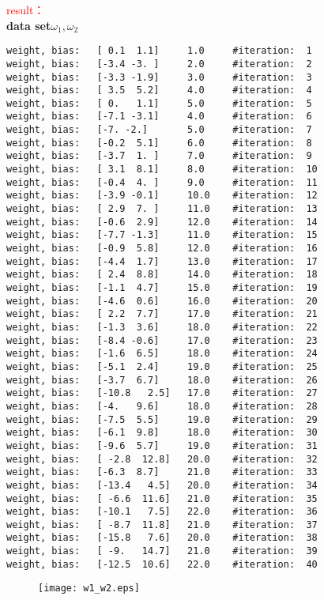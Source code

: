 \noindent \textcolor{red}{result：}\\\textbf{data set$\omega_1,\omega_2$}
\begin{lstlisting}
weight, bias:   [ 0.1  1.1]     1.0     #iteration:  1
weight, bias:   [-3.4 -3. ]     2.0     #iteration:  2
weight, bias:   [-3.3 -1.9]     3.0     #iteration:  3
weight, bias:   [ 3.5  5.2]     4.0     #iteration:  4
weight, bias:   [ 0.   1.1]     5.0     #iteration:  5
weight, bias:   [-7.1 -3.1]     4.0     #iteration:  6
weight, bias:   [-7. -2.]       5.0     #iteration:  7
weight, bias:   [-0.2  5.1]     6.0     #iteration:  8
weight, bias:   [-3.7  1. ]     7.0     #iteration:  9
weight, bias:   [ 3.1  8.1]     8.0     #iteration:  10
weight, bias:   [-0.4  4. ]     9.0     #iteration:  11
weight, bias:   [-3.9 -0.1]     10.0    #iteration:  12
weight, bias:   [ 2.9  7. ]     11.0    #iteration:  13
weight, bias:   [-0.6  2.9]     12.0    #iteration:  14
weight, bias:   [-7.7 -1.3]     11.0    #iteration:  15
weight, bias:   [-0.9  5.8]     12.0    #iteration:  16
weight, bias:   [-4.4  1.7]     13.0    #iteration:  17
weight, bias:   [ 2.4  8.8]     14.0    #iteration:  18
weight, bias:   [-1.1  4.7]     15.0    #iteration:  19
weight, bias:   [-4.6  0.6]     16.0    #iteration:  20
weight, bias:   [ 2.2  7.7]     17.0    #iteration:  21
weight, bias:   [-1.3  3.6]     18.0    #iteration:  22
weight, bias:   [-8.4 -0.6]     17.0    #iteration:  23
weight, bias:   [-1.6  6.5]     18.0    #iteration:  24
weight, bias:   [-5.1  2.4]     19.0    #iteration:  25
weight, bias:   [-3.7  6.7]     18.0    #iteration:  26
weight, bias:   [-10.8   2.5]   17.0    #iteration:  27
weight, bias:   [-4.   9.6]     18.0    #iteration:  28
weight, bias:   [-7.5  5.5]     19.0    #iteration:  29
weight, bias:   [-6.1  9.8]     18.0    #iteration:  30
weight, bias:   [-9.6  5.7]     19.0    #iteration:  31
weight, bias:   [ -2.8  12.8]   20.0    #iteration:  32
weight, bias:   [-6.3  8.7]     21.0    #iteration:  33
weight, bias:   [-13.4   4.5]   20.0    #iteration:  34
weight, bias:   [ -6.6  11.6]   21.0    #iteration:  35
weight, bias:   [-10.1   7.5]   22.0    #iteration:  36
weight, bias:   [ -8.7  11.8]   21.0    #iteration:  37
weight, bias:   [-15.8   7.6]   20.0    #iteration:  38
weight, bias:   [ -9.   14.7]   21.0    #iteration:  39
weight, bias:   [-12.5  10.6]   22.0    #iteration:  40
\end{lstlisting}
\begin{figure}[h]
  \centering
  \texttt{[image: w1\_w2.eps]}
\end{figure}


